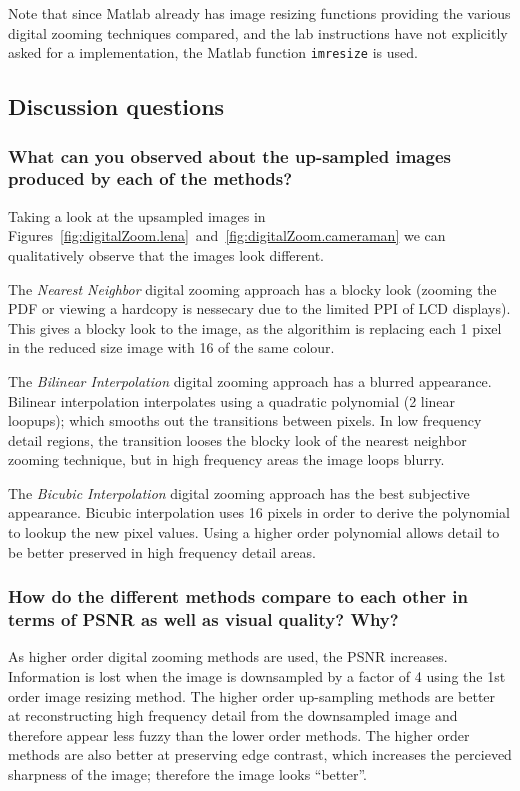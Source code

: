 \documentclass[article, 1.5space, letterpaper, 12pt, oneside, header, footer]{SydeClass}
\begin{document}
Note that since Matlab already has image resizing functions providing the various digital zooming techniques compared, and the lab instructions have not explicitly asked for a implementation, the Matlab function \texttt{imresize} is used.

\clearpage

\subsection{Discussion questions}

\subsubsection{What can you observed about the up-sampled images produced by each of the methods?}

Taking a look at the upsampled images in Figures~\ref{fig:digitalZoom.lena}~and~\ref{fig:digitalZoom.cameraman} we can qualitatively observe that the images look different.

The \emph{Nearest Neighbor} digital zooming approach has a blocky look (zooming the PDF or viewing a hardcopy is nessecary due to the limited PPI of LCD displays). This gives a blocky look to the image, as the algorithim is replacing each 1 pixel in the reduced size image with 16 of the same colour.

The \emph{Bilinear Interpolation} digital zooming approach has a blurred appearance. Bilinear interpolation interpolates using a quadratic polynomial (2 linear loopups); which smooths out the transitions between pixels. In low frequency detail regions, the transition looses the blocky look of the nearest neighbor zooming technique, but in high frequency areas the image loops blurry.

The \emph{Bicubic Interpolation} digital zooming approach has the best subjective appearance. Bicubic interpolation uses 16 pixels in order to derive the polynomial to lookup the new pixel values. Using a higher order polynomial allows detail to be better preserved in high frequency detail areas.

\subsubsection{How do the different methods compare to each other in terms of PSNR as well as visual quality? Why?}

As higher order digital zooming methods are used, the PSNR increases. Information is lost when the image is downsampled by a factor of 4 using the 1st order image resizing method. The higher order up-sampling methods are better at reconstructing high frequency detail from the downsampled image and therefore appear less fuzzy than the lower order methods. The higher order methods are also better at preserving edge contrast, which increases the percieved sharpness of the image; therefore the image looks ``better''.
\end{document}
